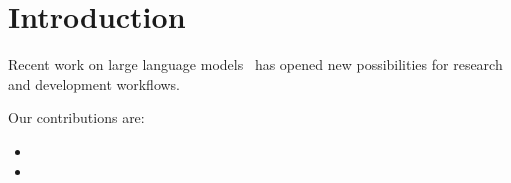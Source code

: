 \section{Introduction}
\label{sec:introduction}

Recent work on large language models~\citep{vaswani2017attention} has opened new possibilities for research and development workflows.

Our contributions are:
\begin{itemize}
  \item {}
  \item {}
\end{itemize}

